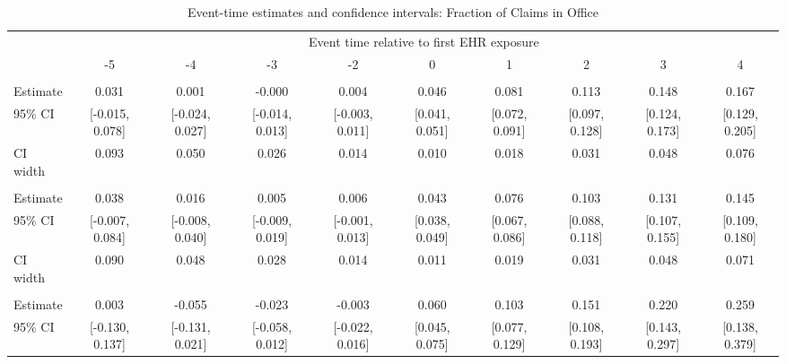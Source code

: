 
\begin{landscape}\begin{table}[!h]
\centering
\caption{\label{tab:ci_pos_office}Event-time estimates and confidence intervals: Fraction of Claims in Office}
\centering
\fontsize{9}{11}\selectfont
\begin{tabular}[t]{lccccccccc}
\toprule
\multicolumn{1}{c}{ } & \multicolumn{9}{c}{Event time relative to first EHR exposure} \\
\cmidrule(l{3pt}r{3pt}){2-10}
 & -5 & -4 & -3 & -2 & 0 & 1 & 2 & 3 & 4\\
\midrule
\addlinespace[0.3em]
\multicolumn{10}{l}{\textbf{All}}\\
\hspace{1em}Estimate & 0.031 & 0.001 & -0.000 & 0.004 & 0.046 & 0.081 & 0.113 & 0.148 & 0.167\\
\hspace{1em}95\% CI & {}[-0.015, 0.078] & {}[-0.024, 0.027] & {}[-0.014, 0.013] & {}[-0.003, 0.011] & {}[0.041, 0.051] & {}[0.072, 0.091] & {}[0.097, 0.128] & {}[0.124, 0.173] & {}[0.129, 0.205]\\
\hspace{1em}CI width & 0.093 & 0.050 & 0.026 & 0.014 & 0.010 & 0.018 & 0.031 & 0.048 & 0.076\\
\addlinespace[0.3em]
\multicolumn{10}{l}{\textbf{Age $<$ 60}}\\
\hspace{1em}Estimate & 0.038 & 0.016 & 0.005 & 0.006 & 0.043 & 0.076 & 0.103 & 0.131 & 0.145\\
\hspace{1em}95\% CI & {}[-0.007, 0.084] & {}[-0.008, 0.040] & {}[-0.009, 0.019] & {}[-0.001, 0.013] & {}[0.038, 0.049] & {}[0.067, 0.086] & {}[0.088, 0.118] & {}[0.107, 0.155] & {}[0.109, 0.180]\\
\hspace{1em}CI width & 0.090 & 0.048 & 0.028 & 0.014 & 0.011 & 0.019 & 0.031 & 0.048 & 0.071\\
\addlinespace[0.3em]
\multicolumn{10}{l}{\textbf{Age $\geq$ 60}}\\
\hspace{1em}Estimate & 0.003 & -0.055 & -0.023 & -0.003 & 0.060 & 0.103 & 0.151 & 0.220 & 0.259\\
\hspace{1em}95\% CI & {}[-0.130, 0.137] & {}[-0.131, 0.021] & {}[-0.058, 0.012] & {}[-0.022, 0.016] & {}[0.045, 0.075] & {}[0.077, 0.129] & {}[0.108, 0.193] & {}[0.143, 0.297] & {}[0.138, 0.379]\\

\end{tabular}
\end{table}
\end{landscape}

